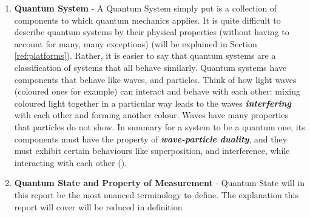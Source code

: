 \documentclass[a4paper]{article}
\begin{document}
\begin{enumerate}
	\item \textbf{Quantum System} - A Quantum System simply put is a collection of components to which quantum mechanics applies. It is quite difficult to describe quantum systems by their physical properties (without having to account for many, many exceptions) (will be explained in Section \ref{ref:platforms}). Rather, it is easier to say that quantum systems are a classification of systems that all behave similarly. Quantum systems have components that behave like waves, and particles. Think of how light waves (coloured ones for example) can interact and behave with each other: mixing coloured light together in a particular way leads to the waves \textit{\textbf{interfering}} with each other and forming another colour. Waves have many properties that particles do not show. In summary for a system to be a quantum one, its components must have the property of \textbf{\textit{wave-particle duality}}, and they must exhibit certain behaviours like superposition, and interference, while interacting with each other (\cite{carcassi-2021}).
	\item \textbf{Quantum State and Property of Measurement} - Quantum State will in this report be the most nuanced terminology to define. The explanation this report will cover will be reduced in definition


\end{enumerate}
\end{document}
